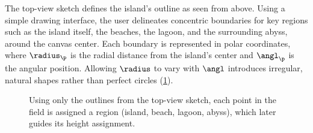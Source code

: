 \documentclass{egpubl}
\begin{document}





The top-view sketch defines the island's outline as seen from above. Using a simple drawing interface, the user delineates concentric boundaries for key regions such as the island itself, the beaches, the lagoon, and the surrounding abyss, around the canvas center. Each boundary is represented in polar coordinates, where $\radius_\p$ is the radial distance from the island's center and $\angl_\p$ is the angular position. Allowing $\radius$ to vary with $\angl$ introduces irregular, natural shapes rather than perfect circles (\cref{fig:coral-island_procedural-height-only}).

\begin{figure}
    \caption{Using only the outlines from the top-view sketch, each point in the field is assigned a region (island, beach, lagoon, abyss), which later guides its height assignment.}
    \label{fig:coral-island_procedural-height-only}
\end{figure}
\end{document}
